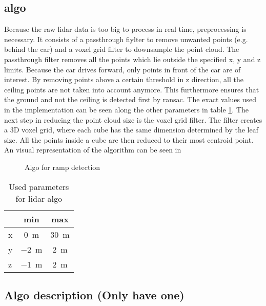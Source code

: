 \subsection{algo}
Because the raw \acrshort{lidar} data is too big to process in real time, preprocessing is necessary.
It consists of a passthrough fiylter to remove unwanted points (e.g. behind the car) and a voxel grid filter to downsample the point cloud.
The passthrough filter removes all the points which lie outside the specified x, y and z limits.
Because the car drives forward, only points in front of the car are of interest.
By removing points above a certain threshold in z direction, all the ceiling points are not taken into account anymore.
This furthermore ensures that the ground and not the ceiling is detected first by \acrshort{ransac}.
The exact values used in the implementation can be seen along the other parameters in table \ref{tab:lidar_params}.
The next step in reducing the point cloud size is the voxel grid filter.
The filter creates a 3D voxel grid, where each cube has the same dimension determined by the leaf size.
All the points inside a cube are then reduced to their most centroid point.
An visual representation of the algorithm can be seen in
\begin{figure}[htb]
    \centering
    
    \caption{Algo for ramp detection}
    \label{fig:flowchart_lidar}
\end{figure}

\begin{table}[ht]
	\centering
	\caption{Used parameters for lidar algo}
	\label{tab:lidar_params}
	\begin{tabular}[t]{lcc}
	\toprule
	&\textbf{min} & \textbf{max}\\
	\midrule
	x 				& \SI{0}{\metre}	& \SI{30}{\metre}\\
    y 				& \SI{-2}{\metre}  & \SI{2}{\metre}\\
	z			    & \SI{-1}{\metre}  & \SI{2}{\metre}\\
	\bottomrule
	\end{tabular}
\end{table}%



\subsection{Algo description (Only have one)}



